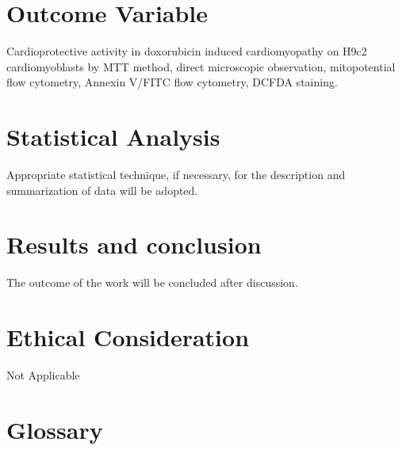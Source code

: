 \documentclass[11pt]{article} %
\begin{document}
\section{Outcome Variable}
\label{sec:Outcome Variable}

Cardioprotective activity in doxorubicin induced cardiomyopathy on H9c2 cardiomyoblasts by MTT method, direct microscopic observation, mitopotential flow cytometry, Annexin V/FITC flow cytometry, DCFDA staining.


\section{Statistical Analysis}
\label{sec:Statistical Analysis}

Appropriate statistical technique, if necessary, for the description and summarization of data will be adopted.

\section{Results and conclusion}
\label{sec:Results and conclusion}

The outcome of the work will be concluded after discussion.

\section{Ethical Consideration}
\label{Sec:ethical}

Not Applicable





\section{Glossary}
\label{sec: Glossary}
\end{document}

